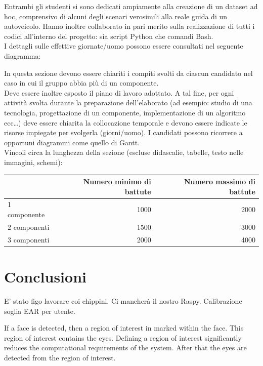 \documentclass[12pt]{article}
\begin{document}
Entrambi gli studenti si sono dedicati ampiamente alla creazione di un dataset ad hoc, comprensivo di alcuni degli scenari verosimili alla reale guida di un autoveicolo. Hanno inoltre collaborato in pari merito sulla realizzazione di tutti i codici all'interno del progetto: sia script Python che comandi Bash.\\

I dettagli sulle effettive giornate/uomo possono essere consultati nel seguente diagramma:

In questa sezione devono essere chiariti i compiti svolti da ciascun candidato nel caso in cui il gruppo abbia più di un componente.\\

Deve essere inoltre esposto il piano di lavoro adottato. A tal fine, per ogni attività svolta durante la preparazione dell'elaborato (ad esempio: studio di una tecnologia, progettazione di un componente, implementazione di un algoritmo ecc…) deve essere chiarita la collocazione temporale e devono essere indicate le risorse impiegate per svolgerla (giorni/uomo). I candidati possono ricorrere a opportuni diagrammi come quello di Gantt.\\


Vincoli circa la lunghezza della sezione (escluse didascalie, tabelle, testo nelle immagini, schemi):

\vspace{1cm}
\begin{tabular}{l|rr}
 & Numero minimo di battute & Numero massimo di battute \\
 \hline
 1 componente & 1000 & 2000 \\
 2 componenti & 1500 & 3000 \\
 3 componenti & 2000 & 4000 \\
 \hline
\end{tabular}

\newpage



\section{Conclusioni}

E' stato figo lavorare coi chippini. Ci mancherà il nostro Raspy.
Calibrazione soglia EAR per utente.

If a face is detected, then a region of interest in marked within the face. This region of interest contains the eyes. Defining a region of interest significantly reduces the computational requirements of the system. After that the eyes are detected from the region of interest.
\end{document}
